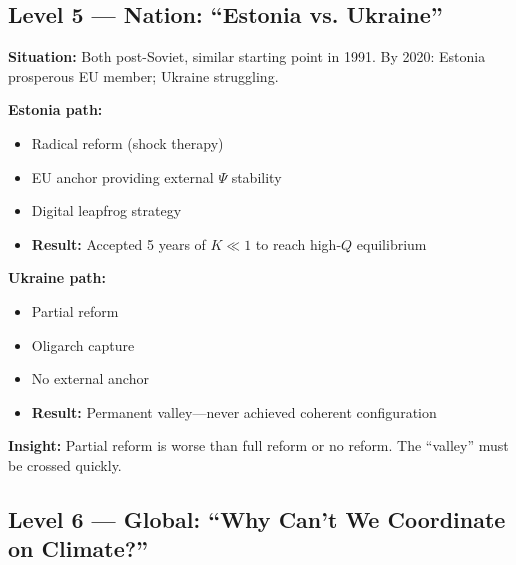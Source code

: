 \subsection{Level 5 — Nation: ``Estonia vs. Ukraine''}

\begin{tcolorbox}[colback=orange!5!white, colframe=orange!75!black,
    title=\textbf{Worked Example L=5: National Transformation}]

\textbf{Situation:} Both post-Soviet, similar starting point in 1991.
By 2020: Estonia prosperous EU member; Ukraine struggling.

\textbf{Estonia path:}
\begin{itemize}[nosep]
    \item Radical reform (shock therapy)
    \item EU anchor providing external $\Psi$ stability
    \item Digital leapfrog strategy
    \item \textbf{Result:} Accepted 5 years of $K \ll 1$ to reach high-$Q$ equilibrium
\end{itemize}

\textbf{Ukraine path:}
\begin{itemize}[nosep]
    \item Partial reform
    \item Oligarch capture
    \item No external anchor
    \item \textbf{Result:} Permanent valley—never achieved coherent configuration
\end{itemize}

\textbf{Insight:} Partial reform is worse than full reform or no reform.
The ``valley'' must be crossed quickly.

\end{tcolorbox}

\subsection{Level 6 — Global: ``Why Can't We Coordinate on Climate?''}

